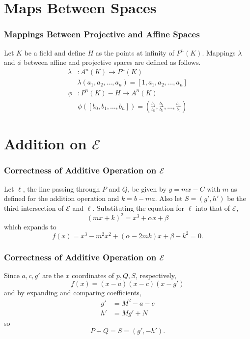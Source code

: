 \documentclass{beamer}
\begin{document}
    \section{Maps Between Spaces}
    \begin{frame}[label=maps]
        \frametitle{Mappings Between Projective and Affine Spaces}
        Let \(K\) be a field and define \(H\) as the points at infinity
        of \(P^n(K)\). Mappings \(\lambda\) and \(\phi\) between
        affine and projective spaces are defined as follows.
        \begin{align*}
            \lambda&: A^n(K) \to P^n(K) \\
            &\lambda(a_1, a_2, \dots, a_n) = [1, a_1, a_2, \dots, a_n]
        \end{align*}
        \begin{align*}
            \phi&: P^n(K) - H \to A^n(K) \\
            &\phi([b_0, b_1, \dots, b_n]) =
                \left(\frac{b_1}{b_0}, \frac{b_2}{b_0}, \dots,
                \frac{b_n}{b_0}\right)
        \end{align*}
        \hyperlink{forms}{}
    \end{frame}

    \section{Addition on \(\mathcal{E}\)}
    \begin{frame}[label=addproof]
        \frametitle{Correctness of Additive Operation on \(\mathcal{E}\)}
        Let \(\ell\), the line passing through \(P\) and \(Q\), be given by
        \(y = mx - C\) with \(m\) as defined for the addition
        operation and \(k = b - ma\). Also let \(S = (g', h')\) be the third
        intersection of
        \(\mathcal{E}\) and \(\ell\). Substituting the equation for \(\ell\)
        into that of \(\mathcal{E}\),
        \[(mx + k)^2 = x^3 + \alpha x + \beta\] which expands to
        \[f(x) = x^3 - m^2x^2 + (\alpha - 2mk)x + \beta - k^2 = 0.\]
    \end{frame}
    \begin{frame}
        \frametitle{Correctness of Additive Operation on \(\mathcal{E}\)}
        Since \(a, c, g'\) are the \(x\) coordinates of \(p, Q, S\),
        respectively,
        \[f(x) = (x - a)(x - c)(x - g')\]
        and by expanding and comparing coefficients,
        \begin{align*}
            g' &= M^2 - a - c \\
            h' &= Mg' + N
        \end{align*}
        so
        \[P + Q = S = (g', -h').\]
        \hyperlink{add}{}
    \end{frame}
\end{document}
